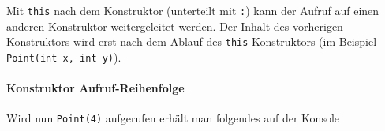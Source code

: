 \documentclass[
  10pt,
  a4paperpaper,
  DIV=11]{scrartcl}
\let\oldparagraph\paragraph
\renewcommand{\paragraph}[1]{\oldparagraph{#1}\mbox{}}
\newenvironment{Shaded}{}{}
\newcommand{\DataTypeTok}[1]{\textcolor[rgb]{0.84,0.23,0.29}{#1}}
\newcommand{\DecValTok}[1]{\textcolor[rgb]{0.00,0.36,0.77}{#1}}
\newcommand{\FunctionTok}[1]{\textcolor[rgb]{0.44,0.26,0.76}{#1}}
\newcommand{\KeywordTok}[1]{\textcolor[rgb]{0.84,0.23,0.29}{#1}}
\newcommand{\NormalTok}[1]{\textcolor[rgb]{0.14,0.16,0.18}{#1}}
\newcommand{\OperatorTok}[1]{\textcolor[rgb]{0.14,0.16,0.18}{#1}}
\newcommand{\StringTok}[1]{\textcolor[rgb]{0.01,0.18,0.38}{#1}}
\numberwithin{equation}{section}
\begin{document}
Mit \texttt{this} nach dem Konstruktor (unterteilt mit \texttt{:}) kann
der Aufruf auf einen anderen Konstruktor weitergeleitet werden. Der
Inhalt des vorherigen Konstruktors wird erst nach dem Ablauf des
\texttt{this}-Konstruktors (im Beispiel
\texttt{Point(int\ x,\ int\ y)}).

\hypertarget{konstruktor-aufruf-reihenfolge}{%
\paragraph{Konstruktor
Aufruf-Reihenfolge}\label{konstruktor-aufruf-reihenfolge}}

\begin{Shaded}
\end{Shaded}

Wird nun \texttt{Point(4)} aufgerufen erhält man folgendes auf der
Konsole
\end{document}

